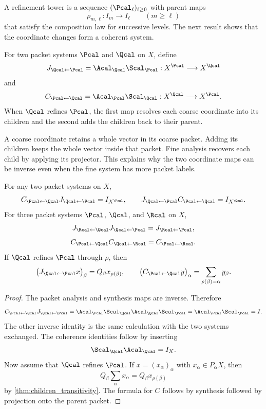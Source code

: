A refinement tower is a sequence $(\Pcal_\ell)_{\ell\geq0}$ with parent maps
\[
\rho_{m,\ell}:I_m\longrightarrow I_\ell
\qquad(m\geq\ell)
\]
that satisfy the composition law for successive levels. The next result shows that the coordinate changes form a coherent system.

\begin{definition}\label{def:coordinate_change}\label{def:coordinate-refinement}
For two packet systems $\Pcal$ and $\Qcal$ on $X$, define
\[
J_{\Qcal\leftarrow\Pcal}
=
\Acal_{\Qcal}\Scal_{\Pcal}:X^{\Pcal}\longrightarrow X^{\Qcal}
\]
and
\[
C_{\Pcal\leftarrow\Qcal}
=
\Acal_{\Pcal}\Scal_{\Qcal}:X^{\Qcal}\longrightarrow X^{\Pcal}.
\]
When $\Qcal$ refines $\Pcal$, the first map resolves each coarse coordinate into its children and the second adds the children back to their parent.
\end{definition}

\begin{keyidea}
A coarse coordinate retains a whole vector in its coarse packet. Adding its children keeps the whole vector inside that packet. Fine analysis recovers each child by applying its projector. This explains why the two coordinate maps can be inverse even when the fine system has more packet labels.
\end{keyidea}

\begin{theorem}\label{thm:coordinate_coherence}\label{prop:perfect-reconstruction}
For any two packet systems on $X$,
\[
C_{\Pcal\leftarrow\Qcal}J_{\Qcal\leftarrow\Pcal}=I_{X^{\Pcal}},
\qquad
J_{\Qcal\leftarrow\Pcal}C_{\Pcal\leftarrow\Qcal}=I_{X^{\Qcal}}.
\]
For three packet systems $\Pcal$, $\Qcal$, and $\Rcal$ on $X$,
\[
J_{\Rcal\leftarrow\Qcal}J_{\Qcal\leftarrow\Pcal}
=
J_{\Rcal\leftarrow\Pcal},
\]
\[
C_{\Pcal\leftarrow\Qcal}C_{\Qcal\leftarrow\Rcal}
=
C_{\Pcal\leftarrow\Rcal}.
\]
If $\Qcal$ refines $\Pcal$ through $\rho$, then
\[
\bigl(J_{\Qcal\leftarrow\Pcal}x\bigr)_\beta
=
Q_\beta x_{\rho(\beta)},
\qquad
\bigl(C_{\Pcal\leftarrow\Qcal}y\bigr)_\alpha
=
\sum_{\rho(\beta)=\alpha}y_\beta.
\]
\end{theorem}

\begin{proof}
The packet analysis and synthesis maps are inverse.  Therefore
\[
C_{\Pcal\leftarrow\Qcal}J_{\Qcal\leftarrow\Pcal}
=
\Acal_{\Pcal}\Scal_{\Qcal}\Acal_{\Qcal}\Scal_{\Pcal}
=
\Acal_{\Pcal}\Scal_{\Pcal}
=
I.
\]
The other inverse identity is the same calculation with the two systems exchanged.  The coherence identities follow by inserting
\[
\Scal_{\Qcal}\Acal_{\Qcal}=I_X.
\]
Now assume that $\Qcal$ refines $\Pcal$.  If $x=(x_\alpha)_\alpha$ with $x_\alpha\in P_\alpha X$, then
\[
Q_\beta\sum_\alpha x_\alpha
=
Q_\beta x_{\rho(\beta)}
\]
by \cref{thm:children_transitivity}.  The formula for $C$ follows by synthesis followed by projection onto the parent packet.
\end{proof}

